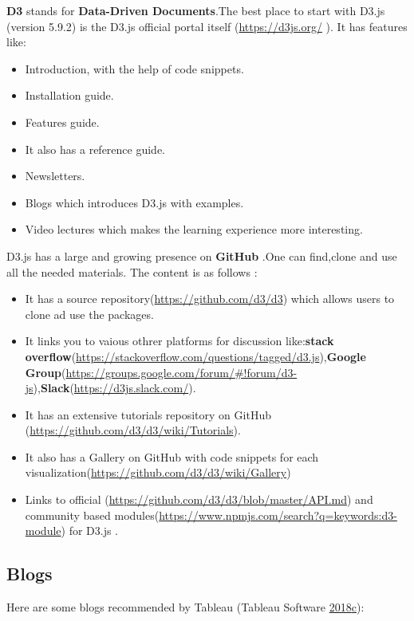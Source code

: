 \documentclass[]{book}
\providecommand{\tightlist}{%
  \setlength{\itemsep}{0pt}\setlength{\parskip}{0pt}}
\begin{document}
\textbf{D3} stands for \textbf{Data-Driven Documents}.The best place to start with D3.js (version 5.9.2) is the D3.js official portal itself (\url{https://d3js.org/} ). It has features like:

\begin{itemize}
\tightlist
\item
  Introduction, with the help of code snippets.
\item
  Installation guide.
\item
  Features guide.
\item
  It also has a reference guide.
\item
  Newsletters.
\item
  Blogs which introduces D3.js with examples.
\item
  Video lectures which makes the learning experience more interesting.
\end{itemize}

D3.js has a large and growing presence on \textbf{GitHub} .One can find,clone and use all the needed materials. The content is as follows :

\begin{itemize}
\tightlist
\item
  It has a source repository(\url{https://github.com/d3/d3}) which allows users to clone ad use the packages.
\item
  It links you to vaious othrer platforms for discussion like:\textbf{stack overflow}(\url{https://stackoverflow.com/questions/tagged/d3.js}),\textbf{Google Group}(\url{https://groups.google.com/forum/\#!forum/d3-js}),\textbf{Slack}(\url{https://d3js.slack.com/}).
\item
  It has an extensive tutorials repository on GitHub (\url{https://github.com/d3/d3/wiki/Tutorials}).
\item
  It also has a Gallery on GitHub with code snippets for each visualization(\url{https://github.com/d3/d3/wiki/Gallery})
\item
  Links to official (\url{https://github.com/d3/d3/blob/master/API.md}) and community based modules(\url{https://www.npmjs.com/search?q=keywords:d3-module}) for D3.js .
\end{itemize}

\hypertarget{blogs-1}{%
\subsection{Blogs}\label{blogs-1}}

Here are some blogs recommended by Tableau (Tableau Software \protect\hyperlink{ref-Top_10_Blogs}{2018}\protect\hyperlink{ref-Top_10_Blogs}{c}):
\end{document}
